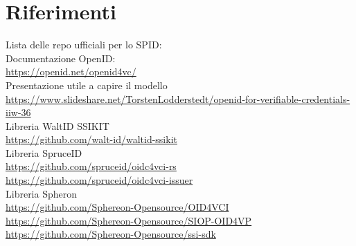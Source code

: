 \section{Riferimenti}
Lista delle repo ufficiali per lo SPID:
\\ Documentazione OpenID:
\\ \url{https://openid.net/openid4vc/}
\\ Presentazione utile a capire il modello
\\ \url{https://www.slideshare.net/TorstenLodderstedt/openid-for-verifiable-credentials-iiw-36}
\\ Libreria WaltID SSIKIT
\\ \url{https://github.com/walt-id/waltid-ssikit}
\\ Libreria SpruceID
\\ \url{https://github.com/spruceid/oidc4vci-rs}
\\ \url{https://github.com/spruceid/oidc4vci-issuer}
\\ Libreria Spheron
\\ \url{https://github.com/Sphereon-Opensource/OID4VCI}
\\ \url{https://github.com/Sphereon-Opensource/SIOP-OID4VP}
\\ \url{https://github.com/Sphereon-Opensource/ssi-sdk}
